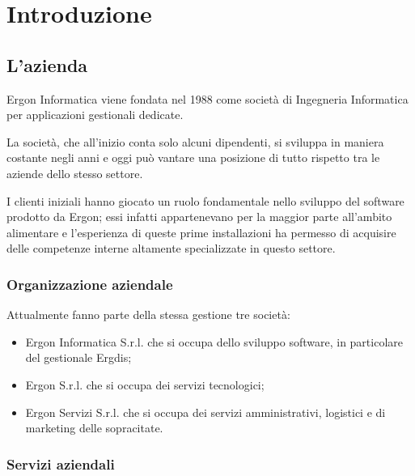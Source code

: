 
\chapter{Introduzione}
\label{cap:introduzione}

\section{L'azienda}

Ergon Informatica viene fondata nel 1988 come società di Ingegneria Informatica per applicazioni gestionali dedicate.

La società, che all'inizio conta solo alcuni dipendenti, si sviluppa in maniera costante negli anni e oggi può vantare una posizione di tutto rispetto tra le aziende dello stesso settore.

I clienti iniziali hanno giocato un ruolo fondamentale nello sviluppo del software prodotto da Ergon; essi infatti appartenevano per la maggior parte all'ambito alimentare e l'esperienza di queste prime installazioni ha permesso di acquisire delle competenze interne altamente specializzate in questo settore. 
\subsection{Organizzazione aziendale}
Attualmente fanno parte della stessa gestione tre società:

\begin{itemize}
\item Ergon Informatica S.r.l. che si occupa dello sviluppo software, in particolare del gestionale Ergdis;
\item Ergon S.r.l. che si occupa dei servizi tecnologici;
\item Ergon Servizi S.r.l. che si occupa dei servizi amministrativi, logistici e di marketing delle sopracitate.
\end{itemize}

\subsection{Servizi aziendali}

